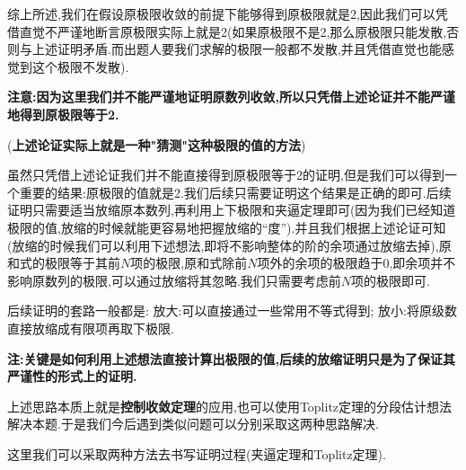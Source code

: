 \documentclass[../../main.tex]{subfiles}%
\begin{document}
\begin{note}
综上所述,我们在假设原极限收敛的前提下能够得到原极限就是2,因此我们可以凭借直觉不严谨地断言原极限实际上就是2(如果原极限不是2,那么原极限只能发散,否则与上述证明矛盾.而出题人要我们求解的极限一般都不发散,并且凭借直觉也能感觉到这个极限不发散).

\textbf{注意:因为这里我们并不能严谨地证明原数列收敛,所以只凭借上述论证并不能严谨地得到原极限等于2.}

(\textbf{上述论证实际上就是一种"猜测"这种极限的值的方法})

虽然只凭借上述论证我们并不能直接得到原极限等于2的证明,但是我们可以得到一个重要的结果:原极限的值就是2.我们后续只需要证明这个结果是正确的即可.后续证明只需要适当放缩原本数列,再利用上下极限和夹逼定理即可(因为我们已经知道极限的值,放缩的时候就能更容易地把握放缩的“度”).并且我们根据上述论证可知(放缩的时候我们可以利用下述想法,即将不影响整体的阶的余项通过放缩去掉),原和式的极限等于其前$N$项的极限,原和式除前$N$项外的余项的极限趋于0,即余项并不影响原数列的极限,可以通过放缩将其忽略.我们只需要考虑前$N$项的极限即可.

后续证明的套路一般都是:
放大:可以直接通过一些常用不等式得到;
放小:将原级数直接放缩成有限项再取下极限.

\textbf{注:关键是如何利用上述想法直接计算出极限的值,后续的放缩证明只是为了保证其严谨性的形式上的证明.}
\end{note}
\begin{remark}
上述思路本质上就是\textbf{控制收敛定理}的应用,也可以使用Toplitz定理的分段估计想法解决本题.于是我们今后遇到类似问题可以分别采取这两种思路解决.

这里我们可以采取两种方法去书写证明过程(夹逼定理和Toplitz定理).
\end{remark}
\end{document}
